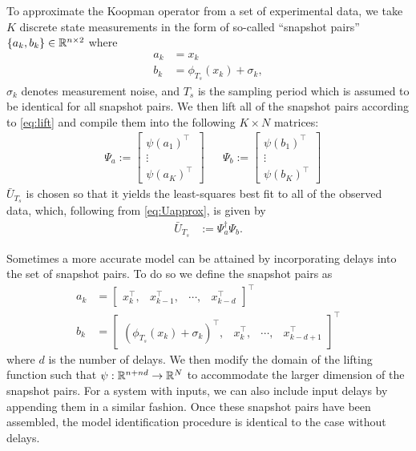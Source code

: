 To approximate the Koopman operator from a set of experimental data, we take $K$ discrete state measurements 
in the form of so-called ``snapshot pairs'' ${ \{ a_k , b_k \} \in \mathbb{R}^{n \times 2} }$ where
\begin{align}
    a_{k} &= x_k \\
    b_{k} &= \phi_{T_s} (x_k) + \sigma_k,
    \label{eq:ab}
\end{align}
$\sigma_k$ denotes measurement noise, and $T_s$ is the sampling period which is assumed to be identical for all snapshot pairs.
We then lift all of the snapshot pairs according to \eqref{eq:lift} and compile them into the following ${K \times N}$ matrices:
\begin{align}
    &\Psi_a := \begin{bmatrix} {\psi}(a_1)^\top \\ \vdots \\  {\psi}(a_K)^\top \end{bmatrix}
    &&\Psi_b := \begin{bmatrix} {\psi}(b_1)^\top \\ \vdots \\  {\psi}(b_K)^\top \end{bmatrix}
    \label{eq:Psi}
\end{align}
$\bar{U}_{T_s}$ is chosen so that it yields the least-squares best fit to all of the observed data, which, following from \eqref{eq:Uapprox}, is given by 
\begin{align}
    \bar{U}_{T_s} &:= \Psi_a^\dagger \Psi_b.
\end{align}

Sometimes a more accurate model can be attained by incorporating delays into the set of snapshot pairs. To do so we define the snapshot pairs as
\begin{align}
    a_k &= \begin{bmatrix} x_k^\top, & x_{k-1}^\top, & \cdots, & x_{k-d}^\top \end{bmatrix}^\top \\
    b_k &= \begin{bmatrix} \left( \phi_{T_s} (x_k) + \sigma_k \right)^\top, & x_{k}^\top, & \cdots, & x_{k-d+1}^\top \end{bmatrix}^\top
\end{align}
where $d$ is the number of delays.
We then modify the domain of the lifting function such that $\psi : \mathbb{R}^{n+nd} \to \mathbb{R}^{N}$ to accommodate the larger dimension of the snapshot pairs.
For a system with inputs, we can also include input delays by appending them in a similar fashion.
Once these snapshot pairs have been assembled, the model identification procedure is identical to the case without delays.


